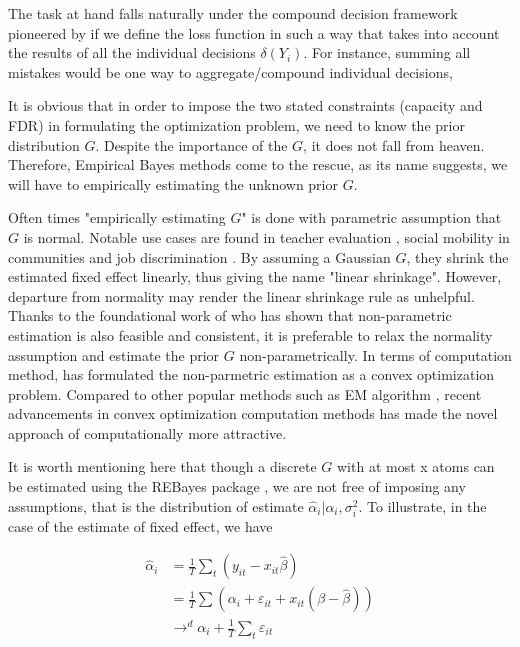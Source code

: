 \documentclass[12pt]{article}
\begin{document}
The task at hand falls naturally under the compound decision framework
pioneered by \cite{robbins1992empirical} if we define the loss function in such
a way that takes into account the results of all the individual decisions
$\delta(Y_i)$. For instance, summing all mistakes would be one way to
aggregate/compound individual decisions,

It is obvious that in order to impose the two stated constraints (capacity and
FDR) in formulating the optimization problem, we need to know the prior
distribution $G$. Despite the importance of the $G$, it does not fall from
heaven. Therefore, Empirical Bayes methods come to the rescue, as its name
suggests, we will have to empirically estimating the unknown prior $G$.

Often times "empirically estimating \(G\)" is done with parametric assumption
that \(G\) is normal. Notable use cases are found in teacher evaluation
\cite{chetty2014measuring}, social mobility in communities
\cite{chetty2018impacts} and job discrimination \cite{kline2021reasonable}. By
assuming a Gaussian $G$, they shrink the estimated fixed effect linearly, thus
giving the name "linear shrinkage". However, departure from normality may
render the linear shrinkage rule as unhelpful. Thanks to the foundational work
of \cite{} who has shown that non-parametric estimation is also feasible and
consistent, it is preferable to relax the normality assumption and estimate the
prior $G$ non-parametrically. In terms of computation method, \cite{} has
formulated the non-parmetric estimation as a convex optimization problem.
Compared to other popular methods such as EM algorithm
\cite{laird1978nonparametric}, recent advancements in convex optimization
computation methods \cite{andersen2010mosek} has made the novel approach of
\cite{koenker2014convex} computationally more attractive.

It is worth mentioning here that though a discrete $G$ with at most x atoms can
be estimated using the REBayes package \cite{koenker2017rebayes}, we are not
free of imposing any assumptions, that is the distribution of estimate
$\hat{\alpha}_i|\alpha_i,\sigma_i^2.$ To illustrate, in the case of the
estimate of fixed effect, we have

\begin{align*}
    \hat{\alpha}_i & =\frac{1}{T}\sum_t (y_{it}-x_{it}\hat{\beta})                         \\
                   & =\frac{1}{T}\sum(\alpha_i+\varepsilon_{it}+x_{it}(\beta-\hat{\beta})) \\
                   & \to^d \alpha_i+\frac{1}{T}\sum_t \varepsilon_{it}                     \\
\end{align*}
\end{document}
